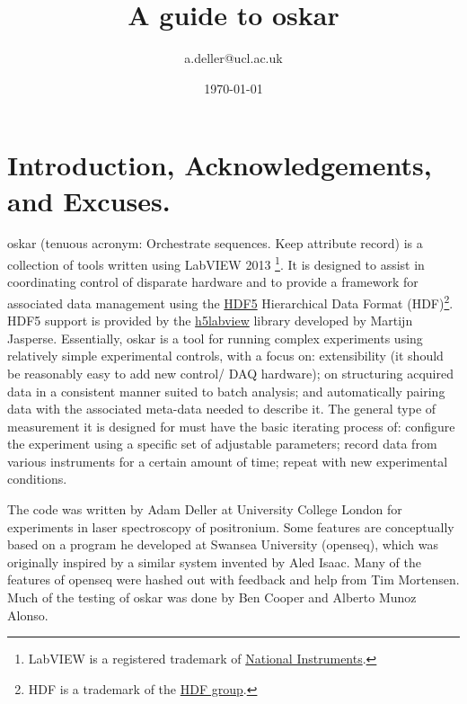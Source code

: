 \documentclass[10pt,a4paper]{article}
\title{A guide to oskar}
\author{a.deller@ucl.ac.uk}
\date{\today}
\begin{document}
\maketitle
\tableofcontents

\section{Introduction, Acknowledgements, and Excuses.}
oskar (tenuous acronym: Orchestrate sequences. Keep attribute record) is a collection of tools written using LabVIEW 2013 \footnote{LabVIEW is a registered trademark of \href{http://www.ni.com/}{National Instruments}.}. It is designed to assist in coordinating control of disparate hardware and to provide a framework for associated data management using the \href{https://www.hdfgroup.org/why_hdf/}{HDF5} Hierarchical Data Format (HDF)\footnote{HDF is a trademark of the \href{http://www.hdfgroup.org/}{HDF group}.}.   HDF5 support is provided by the \href{http://h5labview.sourceforge.net/}{h5labview} library developed by Martijn Jasperse.  Essentially, oskar is a tool for running complex experiments using relatively simple experimental controls, with a focus on: extensibility (it should be reasonably easy to add new control/ DAQ hardware); on structuring acquired data in a consistent manner suited to batch analysis; and automatically pairing data with the associated meta-data needed to describe it.  The general type of measurement it is designed for must have the basic iterating process of: configure the experiment using a specific set of adjustable parameters; record data from various instruments for a certain amount of time; repeat with new experimental conditions.

The code was written by Adam Deller at University College London for experiments in laser spectroscopy of positronium. Some features are conceptually based on a program he developed at Swansea University (openseq), which was originally inspired by a similar system invented by Aled Isaac.  Many of the features of openseq were hashed out with feedback and help from Tim Mortensen. Much of the testing of oskar was done by Ben Cooper and Alberto Munoz Alonso.
\end{document}
